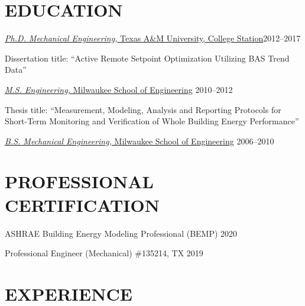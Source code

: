 \documentclass[margin]{res} %
\begin{document}
\begin{resume}





\section{EDUCATION}

\underline{{\textit{Ph.D. Mechanical Engineering,} Texas A\&M University, College Station}}\hfill 2012--2017

\parbox{11cm}{Dissertation title: ``Active Remote Setpoint Optimization Utilizing BAS Trend Data''}

\underline{{\sl M.S. Engineering,} Milwaukee School of Engineering} \hfill 2010--2012

\parbox{11cm}{Thesis title: ``Measurement, Modeling, Analysis and Reporting Protocols for Short-Term Monitoring and Verification of Whole Building Energy Performance''}

\underline{{\sl B.S. Mechanical Engineering,} Milwaukee School of Engineering} \hfill 2006--2010

\section{PROFESSIONAL CERTIFICATION}

ASHRAE Building Energy Modeling Professional (BEMP) \hfill 2020

Professional Engineer (Mechanical) \#135214, TX \hfill 2019

\vspace{0.1in}

\section{EXPERIENCE}


\end{resume}
\end{document}

